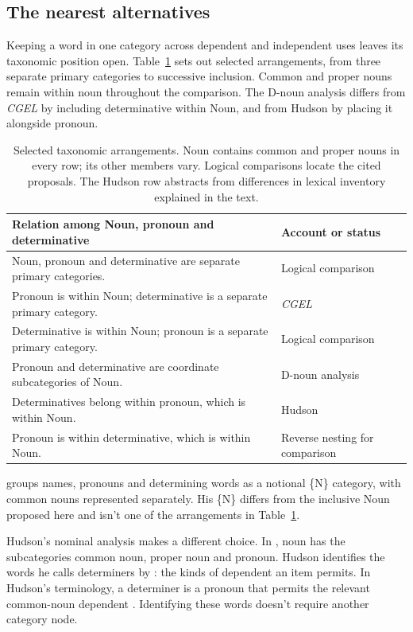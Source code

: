 \documentclass[12pt]{article}
\begin{document}
\subsection{The nearest alternatives}

Keeping a word in one category across dependent and independent uses leaves its taxonomic position open. Table~\ref{tab:rivals} sets out selected arrangements, from three separate primary categories to successive inclusion. Common and proper nouns remain within noun throughout the comparison. The D-noun analysis differs from \textit{CGEL} by including determinative within Noun, and from Hudson by placing it alongside pronoun.

\begin{table}[tb]
\centering\small
\caption{Selected taxonomic arrangements. Noun contains common and proper nouns in every row; its other members vary. Logical comparisons locate the cited proposals. The Hudson row abstracts from differences in lexical inventory explained in the text.}\label{tab:rivals}
\begin{tabular}{>{\raggedright\arraybackslash}p{8.7cm}>{\raggedright\arraybackslash}p{3cm}}
\toprule
Relation among Noun, pronoun and determinative & Account or status \\
\midrule
Noun, pronoun and determinative are separate primary categories. & Logical comparison \\
Pronoun is within Noun; determinative is a separate primary category. & \textit{CGEL} \\
Determinative is within Noun; pronoun is a separate primary category. & Logical comparison \\
Pronoun and determinative are coordinate subcategories of Noun. & D-noun analysis \\
Determinatives belong within pronoun, which is within Noun. & Hudson \\
Pronoun is within determinative, which is within Noun. & Reverse nesting for comparison \\
\bottomrule
\end{tabular}
\end{table}

\textcite{anderson1997notional} groups names, pronouns and determining words as a notional \{N\} category, with common nouns represented separately. His \{N\} differs from the inclusive Noun proposed here and isn't one of the arrangements in Table~\ref{tab:rivals}.

Hudson's nominal analysis makes a different choice. In \textcite[253--254]{hudson2010wordgrammar}, noun has the subcategories common noun, proper noun and pronoun. Hudson identifies the words he calls determiners by : the kinds of dependent an item permits. In Hudson's terminology, a determiner is a pronoun that permits the relevant common-noun dependent \citep[9--10]{hudson2004determiners}. Identifying these words doesn't require another category node.
\end{document}
